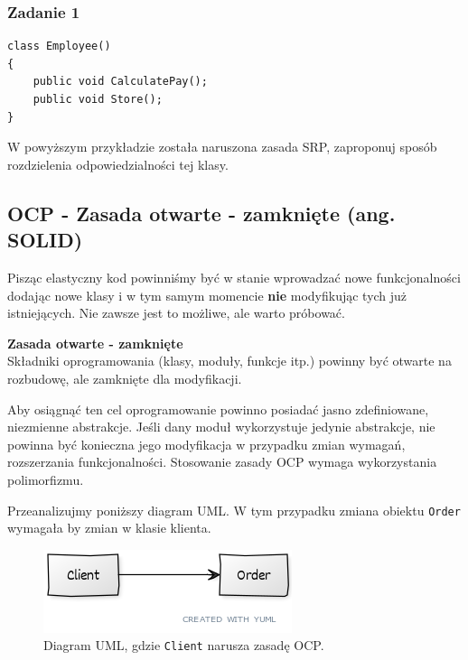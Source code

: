 \subsubsection{Zadanie 1}
\begin{lstlisting}[caption={Naruszenie zasady SRP}, label={lab1/lst/srpViolationEmployee}]
class Employee()
{
	public void CalculatePay();
	public void Store();
}
\end{lstlisting}
W powyższym przykładzie została naruszona zasada SRP, zaproponuj sposób rozdzielenia odpowiedzialności tej klasy. 




\subsection{OCP - Zasada otwarte - zamknięte (ang. S\textbf{O}LID)}

Pisząc elastyczny kod powinniśmy być w stanie wprowadzać nowe funkcjonalności dodając nowe klasy i w tym samym momencie \textbf{nie} modyfikując tych już istniejących. Nie zawsze jest to możliwe, ale warto próbować. 

\begin{tcolorbox}[colback=yellow]	
\textbf{Zasada otwarte - zamknięte}\\
Składniki oprogramowania (klasy, moduły, funkcje itp.) powinny być otwarte na rozbudowę, ale zamknięte dla modyfikacji.
\end{tcolorbox}

Aby osiągnąć ten cel oprogramowanie powinno posiadać jasno zdefiniowane, niezmienne abstrakcje. Jeśli dany moduł wykorzystuje jedynie abstrakcje, nie powinna być konieczna jego modyfikacja w przypadku zmian wymagań, rozszerzania funkcjonalności. Stosowanie zasady OCP wymaga wykorzystania polimorfizmu.

Przeanalizujmy poniższy diagram UML. W tym przypadku zmiana obiektu \texttt{Order} wymagała by zmian w klasie klienta. 

\begin{figure}[hbt!]
	\centering
	\includegraphics[width=0.6\linewidth]{images/SolidOcpViolationUml}
	\caption{Diagram UML, gdzie \texttt{Client} narusza zasadę OCP.}
	\label{lab1/fig/SolidOcpViolationUml}
\end{figure}

